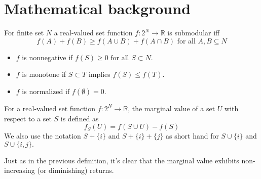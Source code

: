 \documentclass[11pt, a4paper]{article}
\begin{document}
\section{Mathematical background}
\begin{definition}
For finite set $N$ a real-valued set function $f: 2^{N} \rightarrow  \mathbb{R}$ is submodular iff
\begin{equation}
   f(A)+f(B) \geq f(A \cup B)+f(A \cap B)\text{ for all }  A, B \subseteq N  
\end{equation}
\begin{itemize}
    \item $f$ is nonnegative if $f(S) \geq 0 \text{ for all } S \subset N.$
    \item  $f$ is monotone if $S \subset T$ implies $f(S) \leq f(T).$
    \item  $f$ is normalized if $f(\emptyset) = 0.$
\end{itemize}

\end{definition}

 
\begin{definition}
For a real-valued set function $f : 2^N \rightarrow  \mathbb{R}$, the marginal value of a set $U$ with respect to a set $S$ is defined as
\begin{equation}
    f_{S}(U) = f(S \cup U)-f(S)
\end{equation}
We also use the notation $S + \{i\}$ and $S + \{i\} + \{j\}$ as short hand for $S \cup \{i\}$ and $S \cup \{i, j\}.$ 
\end{definition}


Just as in the previous definition, it's clear that the marginal value exhibits non-increasing (or diminishing) returns. 
\end{document}

